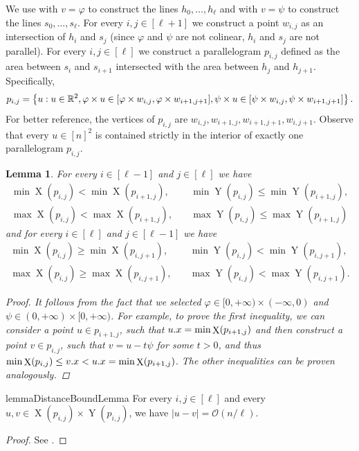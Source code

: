 \documentclass[11pt, letterpaper]{article}
\theoremstyle{plain}
\newtheorem{lemma}{Lemma}
\theoremstyle{definition}
\theoremstyle{remark}
\newcommand{\R}{\mathbb{R}}
\renewcommand{\O}{\mathcal{O}}
\renewcommand{\phi}{\varphi}
\newcommand{\set}[1]{\left\lbrace #1 \right\rbrace}
\newcommand{\eq}[1]{\begin{align*} #1 \end{align*}}
\DeclareMathOperator*{\X}{X}
\DeclareMathOperator*{\Y}{Y}
\begin{document}
We use  with $v = \phi$ to construct the lines $h_0, \dots, h_\ell$ and with $v = \psi$ to construct the lines $s_0, \dots, s_\ell$.
For every $i, j \in [\ell + 1]$ we construct a point $w_{i, j}$ as an intersection of $h_i$ and $s_j$ (since $\phi$ and $\psi$ are not colinear, $h_i$ and $s_j$ are not parallel).
For every $i, j \in [\ell]$ we construct a parallelogram $p_{i, j}$ defined as the area between $s_i$ and $s_{i + 1}$ intersected with the area between $h_j$ and $h_{j + 1}$.
Specifically,
\[p_{i, j} = \set{u : u \in \R^2, \h{u} \in [\h{w_{i, j}}, \h{w_{i + 1, j + 1}}], \s{u} \in [\s{w_{i, j}}, \s{w_{i + 1, j + 1}}]}.\]
For better reference, the vertices of $p_{i, j}$ are $w_{i, j}, w_{i + 1, j}, w_{i + 1, j + 1}, w_{i, j + 1}$.
Observe that every $u \in [n]^2$ is contained strictly in the interior of exactly one parallelogram $p_{i, j}$.

\begin{lemma}\label{monotonicity_lemma}
	For every $i \in [\ell - 1]$ and $j \in [\ell]$ we have
	\eq{
	\min \X(p_{i, j}) < \min \X(p_{i + 1, j}), \quad
	&\min \Y(p_{i, j}) \le \min \Y(p_{i + 1, j}), \\
	\max \X(p_{i, j}) < \max \X(p_{i + 1, j}), \quad
	&\max \Y(p_{i, j}) \le \max \Y(p_{i + 1, j})
	}
	and for every $i \in [\ell]$ and $j \in [\ell - 1]$ we have
	\eq{
		\min \X(p_{i, j}) \ge \min \X(p_{i, j + 1}), \quad
		&\min \Y(p_{i, j}) < \min \Y(p_{i, j + 1}), \\
		\max \X(p_{i, j}) \ge \max \X(p_{i, j + 1}), \quad
		&\max \Y(p_{i, j}) < \max \Y(p_{i, j + 1}).
	}
	\begin{proof}
		It follows from the fact that we selected $\phi \in [0, +\infty) \times (-\infty, 0)$ and $\psi \in (0, +\infty) \times [0, +\infty)$.
		For example, to prove the first inequality, we can consider a point $u \in p_{i + 1, j}$, such that $\x{u} = \min \X(p_{i + 1, j})$
		and then construct a point $v \in p_{i, j}$, such that $v = u - t\psi$ for some $t > 0$, and thus $\min \X(p_{i, j}) \le \x{v} < \x{u} = \min \X(p_{i + 1, j})$.
		The other inequalities can be proven analogously.
	\end{proof}
\end{lemma}

\begin{restatable*}{lemma}{DistanceBoundLemma}\label{distance_bound_lemma}
	For every $i, j \in [\ell]$ and every $u, v \in \X(p_{i, j}) \times \Y(p_{i, j})$, we have $|u - v| = \O(n / \ell)$.
\end{restatable*}
\begin{proof} See . \end{proof}
\end{document}

